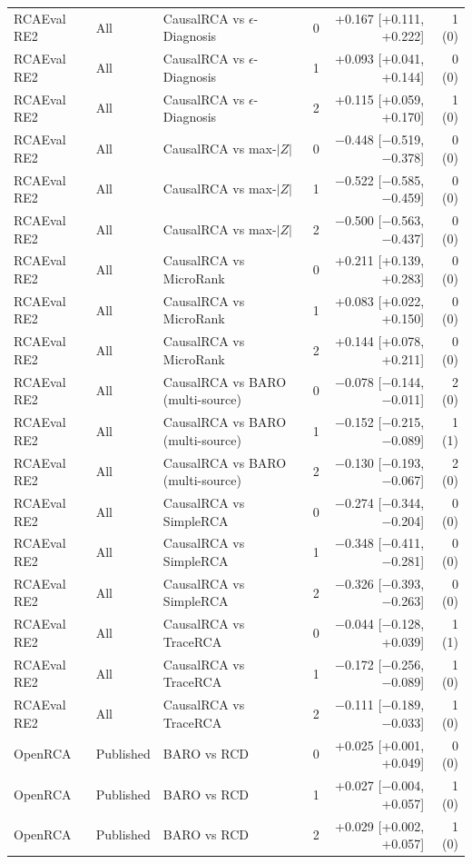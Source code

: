 {\begin{longtable}{llllrr}
RCAEval RE2 & All & CausalRCA vs $\epsilon$-Diagnosis & 0 & +0.167 [+0.111, +0.222] & 1 (0) \\
RCAEval RE2 & All & CausalRCA vs $\epsilon$-Diagnosis & 1 & +0.093 [+0.041, +0.144] & 0 (0) \\
RCAEval RE2 & All & CausalRCA vs $\epsilon$-Diagnosis & 2 & +0.115 [+0.059, +0.170] & 1 (0) \\
RCAEval RE2 & All & CausalRCA vs max-$|Z|$ & 0 & $-$0.448 [$-$0.519, $-$0.378] & 0 (0) \\
RCAEval RE2 & All & CausalRCA vs max-$|Z|$ & 1 & $-$0.522 [$-$0.585, $-$0.459] & 0 (0) \\
RCAEval RE2 & All & CausalRCA vs max-$|Z|$ & 2 & $-$0.500 [$-$0.563, $-$0.437] & 0 (0) \\
RCAEval RE2 & All & CausalRCA vs MicroRank & 0 & +0.211 [+0.139, +0.283] & 0 (0) \\
RCAEval RE2 & All & CausalRCA vs MicroRank & 1 & +0.083 [+0.022, +0.150] & 0 (0) \\
RCAEval RE2 & All & CausalRCA vs MicroRank & 2 & +0.144 [+0.078, +0.211] & 0 (0) \\
RCAEval RE2 & All & CausalRCA vs BARO (multi-source) & 0 & $-$0.078 [$-$0.144, $-$0.011] & 2 (0) \\
RCAEval RE2 & All & CausalRCA vs BARO (multi-source) & 1 & $-$0.152 [$-$0.215, $-$0.089] & 1 (1) \\
RCAEval RE2 & All & CausalRCA vs BARO (multi-source) & 2 & $-$0.130 [$-$0.193, $-$0.067] & 2 (0) \\
RCAEval RE2 & All & CausalRCA vs SimpleRCA & 0 & $-$0.274 [$-$0.344, $-$0.204] & 0 (0) \\
RCAEval RE2 & All & CausalRCA vs SimpleRCA & 1 & $-$0.348 [$-$0.411, $-$0.281] & 0 (0) \\
RCAEval RE2 & All & CausalRCA vs SimpleRCA & 2 & $-$0.326 [$-$0.393, $-$0.263] & 0 (0) \\
RCAEval RE2 & All & CausalRCA vs TraceRCA & 0 & $-$0.044 [$-$0.128, +0.039] & 1 (1) \\
RCAEval RE2 & All & CausalRCA vs TraceRCA & 1 & $-$0.172 [$-$0.256, $-$0.089] & 1 (0) \\
RCAEval RE2 & All & CausalRCA vs TraceRCA & 2 & $-$0.111 [$-$0.189, $-$0.033] & 1 (0) \\
OpenRCA & Published & BARO vs RCD & 0 & +0.025 [+0.001, +0.049] & 0 (0) \\
OpenRCA & Published & BARO vs RCD & 1 & +0.027 [$-$0.004, +0.057] & 1 (0) \\
OpenRCA & Published & BARO vs RCD & 2 & +0.029 [+0.002, +0.057] & 1 (0) \\

\end{longtable}}
